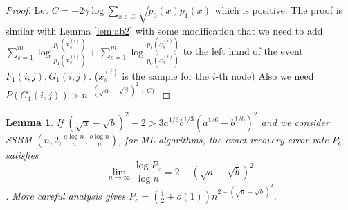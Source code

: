 \documentclass{article}
\newtheorem{lemma}{Lemma}
\begin{document}
\begin{proof}
	Let $C = - 2\gamma\log\sum_{x\in\mathcal{X}} \sqrt{p_0(x)p_1(x)}$ which is positive.
	The proof is similar with Lemma \ref{lem:ab2} with some modification that we need to add $\sum_{s=1}^m \log \frac{p_0(x^{(i)}_s)}{p_1(x_s^{(i)})}
	+ \sum_{s=1}^m \log \frac{p_1(x^{(i)}_s)}{p_0(x_s^{(i)})}$ to the left hand of the event $F_1(i,j), G_1(i,j)$. ($x_s^{(i)}$ is the sample for the $i$-th node)
	Also we need
	$P(G_1(i,j)) > n^{-(\sqrt{\alpha} - \sqrt{\beta})^2 + C)}$.
\end{proof}
\begin{lemma}\label{lem:UL_bound}
	If $(\sqrt{a}-\sqrt{b})^2-2 > 3a^{1/3}b^{1/3}(a^{1/6}-b^{1/6})^2$ and we consider SSBM $(n, 2, \frac{a\log n}{n}, \frac{b \log n}{n})$, for ML algorithms, the exact recovery error rate $P_e$ satisfies $$
	\lim_{n\to \infty} \frac{\log P_e}{\log n} =2-(\sqrt{a} - \sqrt{b})^2$$.
	More careful analysis gives  $P_e = (\frac{1}{2}+o(1))n^{2-(\sqrt{a} - \sqrt{b})^2}$.
\end{lemma}
\end{document}

